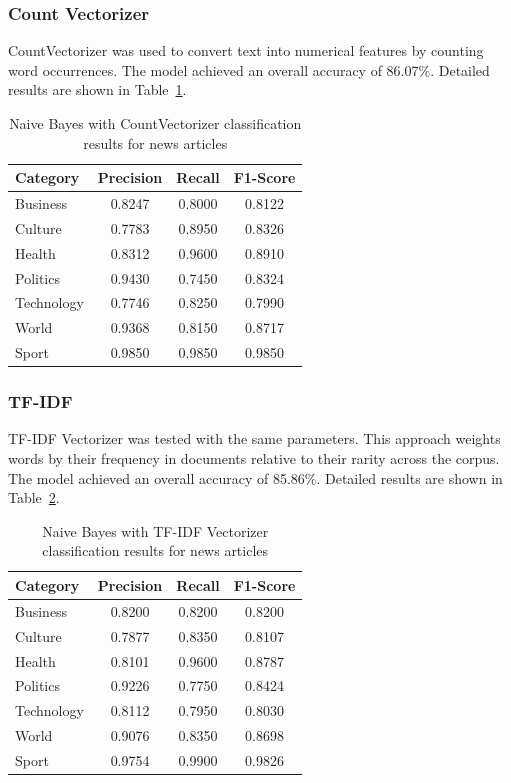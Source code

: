 \documentclass[12pt,a4paper]{article}
\begin{document}
\subsubsection{Count Vectorizer}

CountVectorizer was used to convert text into numerical features by counting word occurrences. The model achieved an overall accuracy of 86.07\%. Detailed results are shown in Table~\ref{tab:news_nb_count}.

\begin{table}[h]
\centering
\begin{tabular}{lccc}
\toprule
Category & Precision & Recall & F1-Score \\
\midrule
Business & 0.8247 & 0.8000 & 0.8122 \\
Culture & 0.7783 & 0.8950 & 0.8326 \\
Health & 0.8312 & 0.9600 & 0.8910 \\
Politics & 0.9430 & 0.7450 & 0.8324 \\
Technology & 0.7746 & 0.8250 & 0.7990 \\
World & 0.9368 & 0.8150 & 0.8717 \\
Sport & 0.9850 & 0.9850 & 0.9850 \\
\bottomrule
\end{tabular}
\caption{Naive Bayes with CountVectorizer classification results for news articles}
\label{tab:news_nb_count}
\end{table}

\subsubsection{TF-IDF}

TF-IDF Vectorizer was tested with the same parameters. This approach weights words by their frequency in documents relative to their rarity across the corpus. The model achieved an overall accuracy of 85.86\%. Detailed results are shown in Table~\ref{tab:news_nb_tfidf}.

\begin{table}[h]
\centering
\begin{tabular}{lccc}
\toprule
Category & Precision & Recall & F1-Score \\
\midrule
Business & 0.8200 & 0.8200 & 0.8200 \\
Culture & 0.7877 & 0.8350 & 0.8107 \\
Health & 0.8101 & 0.9600 & 0.8787 \\
Politics & 0.9226 & 0.7750 & 0.8424 \\
Technology & 0.8112 & 0.7950 & 0.8030 \\
World & 0.9076 & 0.8350 & 0.8698 \\
Sport & 0.9754 & 0.9900 & 0.9826 \\
\bottomrule
\end{tabular}
\caption{Naive Bayes with TF-IDF Vectorizer classification results for news articles}
\label{tab:news_nb_tfidf}
\end{table}
\end{document}
